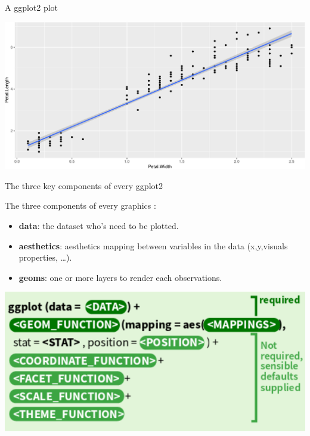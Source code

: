 \documentclass[14pt,ignorenonframetext,]{bredelebeamer}
\newenvironment{Shaded}{\begin{snugshade}}{\end{snugshade}}
\newcommand{\KeywordTok}[1]{\textcolor[rgb]{0.94,0.87,0.69}{#1}}
\newcommand{\DataTypeTok}[1]{\textcolor[rgb]{0.87,0.87,0.75}{#1}}
\newcommand{\StringTok}[1]{\textcolor[rgb]{0.80,0.58,0.58}{#1}}
\newcommand{\OperatorTok}[1]{\textcolor[rgb]{0.94,0.94,0.82}{#1}}
\newcommand{\NormalTok}[1]{\textcolor[rgb]{0.80,0.80,0.80}{#1}}
\providecommand{\tightlist}{%
  \setlength{\itemsep}{0pt}\setlength{\parskip}{0pt}}
\begin{document}
\begin{frame}[fragile]{A ggplot2 plot}

\centering

\begin{Shaded}
\end{Shaded}

\includegraphics{tidyverse_28_03_files/figure-beamer/ggplot2-1.pdf}

\end{frame}

\begin{frame}{The three key components of every ggplot2}

\Large

The three components of every graphics :

\begin{itemize}
\tightlist
\item
  \textbf{data}: the dataset who's need to be plotted.
\item
  \textbf{aesthetics}: aesthetics mapping between variables in the data
  (x,y,visuals properties, \ldots{}).
\item
  \textbf{geoms}: one or more layers to render each observations.
\end{itemize}

\begin{center}\includegraphics[width=0.8\linewidth]{images/3ggplot2} \end{center}

\end{frame}
\end{document}
